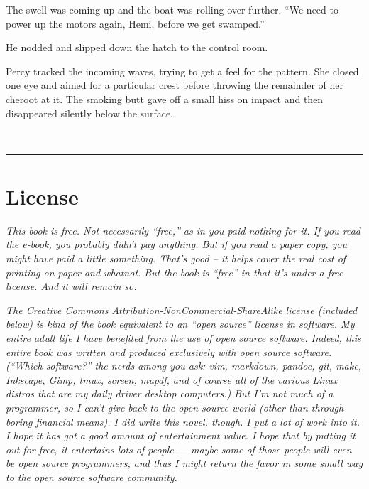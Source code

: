 \documentclass[
]{scrbook}
\begin{document}
The swell was coming up and the boat was rolling over further. ``We need
to power up the motors again, Hemi, before we get swamped.''

He nodded and slipped down the hatch to the control room.

Percy tracked the incoming waves, trying to get a feel for the pattern.
She closed one eye and aimed for a particular crest before throwing the
remainder of her cheroot at it. The smoking butt gave off a small hiss
on impact and then disappeared silently below the surface.

\newpage

\ %

\newpage

\begin{center}\rule{0.5\linewidth}{0.5pt}\end{center}

\hypertarget{license}{%
\section{License}\label{license}}

\emph{This book is free. Not necessarily ``free,'' as in you paid
nothing for it. If you read the e-book, you probably didn't pay
anything. But if you read a paper copy, you might have paid a little
something. That's good -- it helps cover the real cost of printing on
paper and whatnot. But the book is ``free'' in that it's under a free
license. And it will remain so.}

\emph{The Creative Commons Attribution-NonCommercial-ShareAlike license
(included below) is kind of the book equivalent to an ``open source''
license in software. My entire adult life I have benefited from the use
of open source software. Indeed, this entire book was written and
produced exclusively with open source software. (``Which software?'' the
nerds among you ask: vim, markdown, pandoc, git, make, Inkscape, Gimp,
tmux, screen, mupdf, and of course all of the various Linux distros that
are my daily driver desktop computers.) But I'm not much of a
programmer, so I can't give back to the open source world (other than
through boring financial means). I did write this novel, though. I put a
lot of work into it. I hope it has got a good amount of entertainment
value. I hope that by putting it out for free, it entertains lots of
people --- maybe some of those people will even be open source
programmers, and thus I might return the favor in some small way to the
open source software community.}
\end{document}
